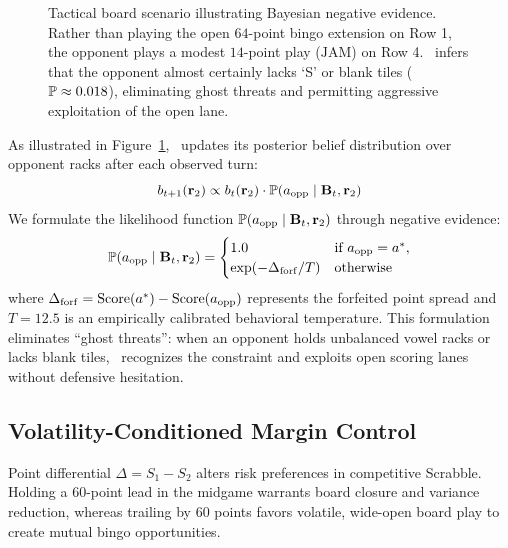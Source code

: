 \begin{figure}[t]
\begin{tikzpicture}
\end{tikzpicture}
\caption{Tactical board scenario illustrating Bayesian negative evidence. Rather than playing the open $64$-point bingo extension on Row 1, the opponent plays a modest $14$-point play ($\mathrm{JAM}$) on Row 4. \algo\ infers that the opponent almost certainly lacks `S' or blank tiles ($\mathbb{P} \approx 0.018$), eliminating ghost threats and permitting aggressive exploitation of the open lane.}
\label{fig:negative_evidence}
\end{figure}

As illustrated in Figure~\ref{fig:negative_evidence}, \algo\ updates its posterior belief distribution over opponent racks after each observed turn:
\begin{equation}
    b_{t+1}(\mathbf{r}_2) \propto b_t(\mathbf{r}_2) \cdot \mathbb{P}(a_{\mathrm{opp}} \mid \mathbf{B}_t, \mathbf{r}_2)
\end{equation}
We formulate the likelihood function $\mathbb{P}(a_{\mathrm{opp}} \mid \mathbf{B}_t, \mathbf{r}_2)$ through negative evidence:
\begin{equation}
    \mathbb{P}(a_{\mathrm{opp}} \mid \mathbf{B}_t, \mathbf{r}_2) = \begin{cases}
        1.0 & \text{if } a_{\mathrm{opp}} = a^*, \\
        \exp(-\Delta_{\mathrm{forf}} / T) & \text{otherwise}
    \end{cases}
\end{equation}
where $\Delta_{\mathrm{forf}} = \mathrm{Score}(a^*) - \mathrm{Score}(a_{\mathrm{opp}})$ represents the forfeited point spread and $T = 12.5$ is an empirically calibrated behavioral temperature. This formulation eliminates ``ghost threats'': when an opponent holds unbalanced vowel racks or lacks blank tiles, \algo\ recognizes the constraint and exploits open scoring lanes without defensive hesitation.

\subsection{Volatility-Conditioned Margin Control}

Point differential $\Delta = S_1 - S_2$ alters risk preferences in competitive Scrabble. Holding a 60-point lead in the midgame warrants board closure and variance reduction, whereas trailing by 60 points favors volatile, wide-open board play to create mutual bingo opportunities.

